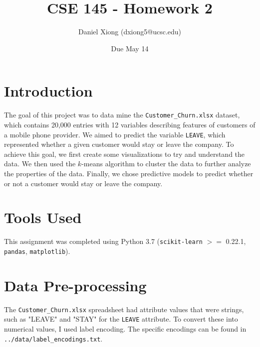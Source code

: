 \documentclass[12pt, notitlepage]{article}
\title{CSE 145 - Homework 2}
\author{Daniel Xiong (dxiong5@ucsc.edu)}
\date{Due May 14}
\begin{document}
\maketitle
\section{Introduction}
The goal of this project was to data mine the \texttt{Customer\_Churn.xlsx} dataset, which contains 20,000 entries with 12 variables describing features of customers of a mobile phone provider. We aimed to predict the variable \texttt{LEAVE}, which represented whether a given customer would stay or leave the company. To achieve this goal, we first create some visualizations to try and understand the data. We then used the $k$-means algorithm to cluster the data to further analyze the properties of the data. Finally, we chose predictive models to predict whether or not a customer would stay or leave the company.

\section{Tools Used}
This assignment was completed using Python 3.7 (\texttt{scikit-learn} $>=$ 0.22.1, \texttt{pandas}, \texttt{matplotlib}).

\section{Data Pre-processing}
The \texttt{Customer\_Churn.xlsx} spreadsheet had attribute values that were strings, such as "LEAVE" and "STAY" for the \texttt{LEAVE} attribute. To convert these into numerical values, I used label encoding. The specific encodings can be found in \texttt{../data/label\_encodings.txt}.
\end{document}

